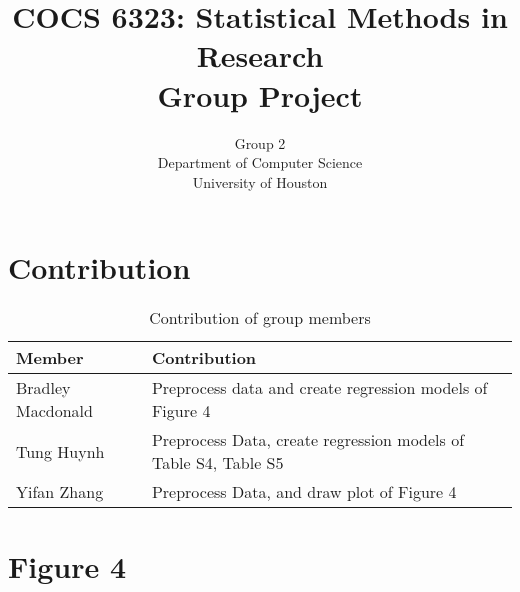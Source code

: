 \documentclass[10pt]{article}          %
\title{COCS 6323: Statistical Methods in Research \\ Group Project} %
\author{Group 2 \\
        Department of Computer Science\\
        University of Houston}         %
\begin{document}



\maketitle              %

\newpage
\tableofcontents        %
\listoftables           %
\listoffigures          %

\newpage
\section{Contribution}
\begin{table}[h]
\begin{tabular}{|l|l|}
\hline
\textbf{Member} & \textbf{Contribution} \\ \hline
Bradley Macdonald & Preprocess data and create regression models of Figure 4\\ \hline
Tung Huynh & Preprocess Data, create regression models of Table S4, Table S5\\ \hline
Yifan Zhang & Preprocess Data, and draw plot of Figure 4 \\ \hline
\end{tabular}
\caption{Contribution of group members}
\label{tbl:contribution}
\end{table}

\newpage
\section{Figure 4}

\newpage
\end{document}
